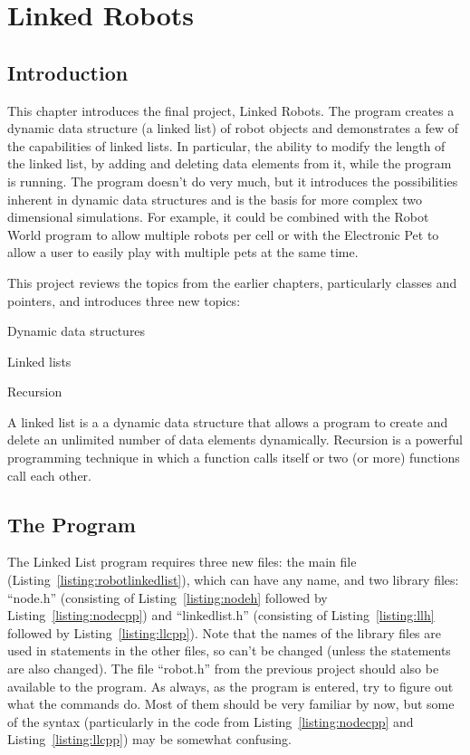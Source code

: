 
\chapter{Linked Robots}

\section{Introduction}

This chapter introduces the final project, Linked Robots.  The program creates a dynamic data structure (a linked list) of robot objects and demonstrates a few of the capabilities of linked lists.  In particular, the ability to modify the length of the linked list, by adding and deleting data elements from it, while the program is running.  The program doesn't do very much, but it introduces the possibilities inherent in dynamic data structures and is the basis for more complex two dimensional simulations.  For example, it could be combined with the Robot World program to allow multiple robots per cell or with the Electronic Pet to allow a user to easily play with multiple pets at the same time.

This project reviews the topics from the earlier chapters, particularly classes and pointers, and introduces three new topics:
\begin{tight_itemize}
\item Dynamic data structures
  \item Linked lists
   \item Recursion
\end{tight_itemize}

A linked list is a a dynamic data structure that allows a program to create and delete an unlimited number of data elements dynamically.  Recursion is a powerful programming technique in which a function calls itself or two (or more) functions call each other.

\section{The Program}

The Linked List program requires three new files: 
the main file (Listing~\ref{listing:robotlinkedlist}), which can have any name, and two library files: ``node.h'' (consisting of  Listing~\ref{listing:nodeh} followed by
Listing~\ref{listing:nodecpp}) and ``linkedlist.h'' (consisting of 
Listing~\ref{listing:llh} followed by
Listing~\ref{listing:llcpp}).  Note that the names of the library files are used in  statements in the other files, so can't be changed (unless the  statements are also changed).  The file ``robot.h'' from the previous project should  also be available to the program.  As always, as the program is entered, try to figure out what the commands do.  Most of them should be very familiar by now, but some of the syntax (particularly in the code from Listing~\ref{listing:nodecpp} and Listing~\ref{listing:llcpp}) may be somewhat confusing.

